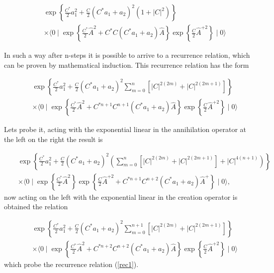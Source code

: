 \documentclass[12pt,letterpaper]{report}
\begin{document}
\begin{eqnarray}
&&\exp \left\{ \frac{C^{*}}2a_1^2+\frac C2\left(
C^{*}a_{1}+a_2\right) ^2\left(1+\left| C\right| ^2\right) \right\}
\nonumber \\ &&\times \langle 0 \mid \exp \left\{
\frac{C^{*}}2\hat{A}^2+C^{*}C\left(C^{*}a_{1}+a_2\right)
\hat{A}\right\} \exp \left\{ \frac C2\hat{A} ^{+2}\right\} \mid
0\rangle \label{A5}
\end{eqnarray}

In such a way after n-steps it is possible to arrive to a
recurrence relation, which can be proven by mathematical
induction. This recurrence relation has the form

\begin{eqnarray}
&&\exp \left\{ \frac{C^{*}}2a_1^2+\frac C2\left(
C^{*}a_{1}+a_2\right) ^2\sum\limits_{m=0}^n\left[ \left| C\right|
^{2\left(2m\right) }+\left| C\right| ^{2\left(2m+1\right) }\right]
\right\} \nonumber \\ &&\times \langle 0 \mid \exp \left\{
\frac{C^{*}}2\hat{A}^2+C^{*n+1}C^{n+1} \left(
C^{*}a_{1}+a_2\right) \hat{A}\right\} \exp \left\{ \frac C2\hat{A}
^{+2}\right\} \mid 0\rangle \label{rec1}
\end{eqnarray}

Lets probe it, acting with the exponential linear in the
annihilation operator at the left on the right the result is

\begin{eqnarray}
&&\exp \left\{ \frac{C^{*}}2a_1^2+\frac C2\left(
C^{*}a_{1}+a_2\right) ^2\left(\sum\limits_{m=0}^n\left[ \left|
C\right| ^{2\left(2m\right) }+\left| C\right| ^{2\left(
2m+1\right) }\right] +\left| C\right| ^{4\left(n+1\right) }\right)
\right\} \nonumber \\ &&\times \langle 0 \mid \exp \left\{
\frac{C^{*}}2\hat{A}^2\right\} \exp \left\{ \frac
C2\hat{A}^{+2}+C^{*n+1}C^{n+2}\left(C^{*}a_{1}+a_2\right)
\hat{A}^{+}\right\} \mid 0\rangle,
\end{eqnarray}
now acting on the left with the exponential linear in the creation
operator is obtained the relation

\begin{eqnarray}
&&\exp \left\{ \frac{C^{*}}2a_1^2+\frac C2\left(
C^{*}a_{1}+a_2\right) ^2\sum\limits_{m=0}^{n+1}\left[ \left|
C\right| ^{2\left(2m\right) }+\left| C\right| ^{2\left(
2m+1\right) }\right] \right\} \nonumber \\ &&\times \langle 0 \mid
\exp \left\{ \frac{C^{*}}2\hat{A}^2+C^{*n+2}C^{n+2} \left(
C^{*}a_{1}+a_2\right) \hat{A}\right\} \exp \left\{ \frac C2\hat{A}
^{+2}\right\} \mid 0\rangle \label{A6}
\end{eqnarray}
which probe the recurrence relation (\ref{rec1}).
\end{document}
